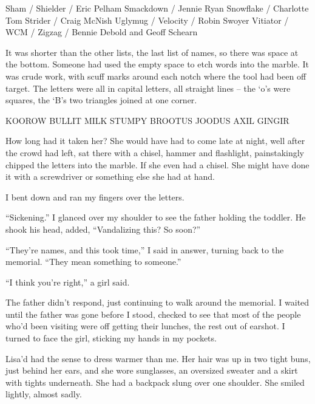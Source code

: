 Sham /
Shielder / Eric Pelham
Smackdown / Jennie Ryan
Snowflake / Charlotte Tom
Strider / Craig McNish
Uglymug /
Velocity / Robin Swoyer
Vitiator /
WCM /
Zigzag / Bennie Debold and Geoff Schearn



It was shorter than the other lists, the last list of names, so there was space at the bottom.  Someone had used the empty space to etch words into the marble.  It was crude work, with scuff marks around each notch where the tool had been off target.  The letters were all in capital letters, all straight lines – the `o's were squares, the `B's two triangles joined at one corner.



KOOROW   BULLIT
MILK                   STUMPY
BROOTUS  JOODUS
AXIL         GINGIR



How long had it taken her?  She would have had to come late at night, well after the crowd had left, sat there with a chisel, hammer and flashlight, painstakingly chipped the letters into the marble.  If she even had a chisel.  She might have done it with a screwdriver or something else she had at hand.



I bent down and ran my fingers over the letters.



``Sickening.'' I glanced over my shoulder to see the father holding the toddler.  He shook his head, added, ``Vandalizing this?  So soon?''



``They're names, and this took time,'' I said in answer, turning back to the memorial.  ``They mean something to someone.''



``I think you're right,'' a girl said.



The father didn't respond, just continuing to walk around the memorial.  I waited until the father was gone before I stood, checked to see that most of the people who'd been visiting were off getting their lunches, the rest out of earshot.  I turned to face the girl, sticking my hands in my pockets.



Lisa'd had the sense to dress warmer than me.  Her hair was up in two tight buns, just behind her ears, and she wore sunglasses, an oversized sweater and a skirt with tights underneath.  She had a backpack slung over one shoulder.  She smiled lightly, almost sadly.



